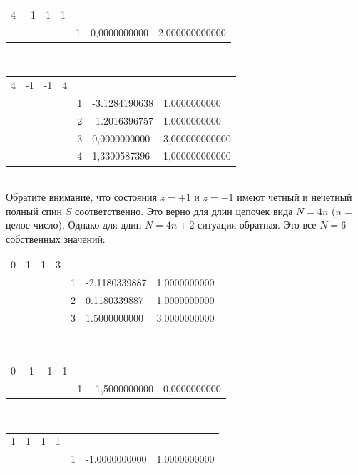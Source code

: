 \documentclass[11pt]{article}
\begin{document}
\begin{tabular}{lllllll}    
    
    4 & –1 & 1 & 1 & & & \\
    & & & & 1 & 0,0000000000 & 2,000000000000 \\
\end{tabular}   \\

\begin{tabular}{lllllll}    
	4 & -1 & -1 & 4 & & & \\
    & & & & 1 & -3.1284190638 & 1.0000000000 \\
    & & & & 2 & -1.2016396757 & 1.0000000000 \\
    & & & & 3 & 0,0000000000 & 3,000000000000 \\
    & & & & 4 & 1,3300587396 & 1,000000000000 \\
\end{tabular}    \\

Обратите внимание, что состояния $z = + 1$ и $z = -1$ имеют четный и нечетный полный спин $S$ соответственно. Это верно для длин цепочек вида $N = 4n$ ($n$ = целое число). Однако для длин $N = 4n + 2$ ситуация обратная. Это все $N = 6$ собственных значений:\\

\begin{tabular}{lllllll}    
    0 & 1 & 1 & 3 & & & \\
    & & & & 1 & -2.1180339887 & 1.0000000000 \\
    & & & & 2 & 0.1180339887 & 1.0000000000 \\
    & & & & 3 & 1.5000000000 & 3.0000000000 \\
\end{tabular}    \\

\begin{tabular}{lllllll}        
    0 & -1 & -1 & 1 & & & \\
    & & & & 1 & -1,5000000000 & 0,0000000000 \\
\end{tabular}    \\

\begin{tabular}{lllllll}        
    1 & 1 & 1 & 1& & & \\
    & & & & 1 & -1.0000000000 & 1.0000000000 \\
\end{tabular}    \\
\end{document}
